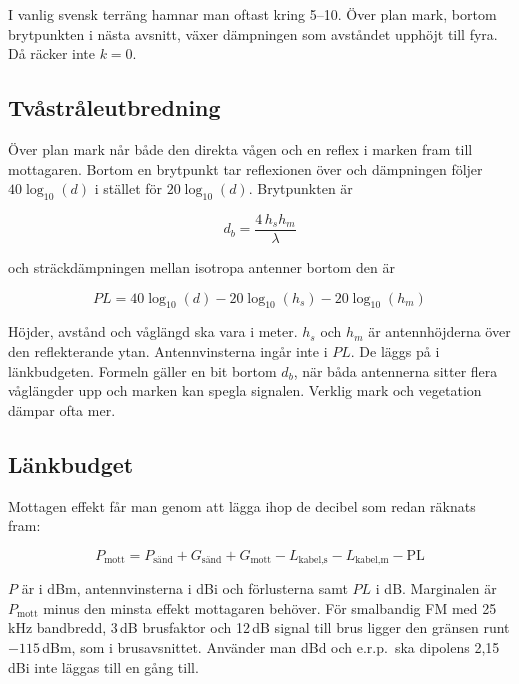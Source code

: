 I vanlig svensk terräng hamnar man oftast kring 5--10. Över plan mark,
bortom brytpunkten i nästa avsnitt, växer dämpningen som avståndet
upphöjt till fyra. Då räcker inte $k = 0$.

\subsection{Tvåstråleutbredning}

Över plan mark når både den direkta vågen och en reflex i marken fram till
mottagaren. Bortom en brytpunkt tar reflexionen över och dämpningen följer
$40\log_{10}(d)$ i stället för $20\log_{10}(d)$. Brytpunkten är

\begin{equation}
	d_b = \frac{4\, h_s h_m}{\lambda}
\end{equation}

och sträckdämpningen mellan isotropa antenner bortom den är

\begin{equation}
	PL = 40\log_{10}(d) - 20\log_{10}(h_s) - 20\log_{10}(h_m)
\end{equation}

Höjder, avstånd och våglängd ska vara i meter. $h_s$ och $h_m$ är
antennhöjderna över den reflekterande ytan. Antennvinsterna ingår inte i
$PL$. De läggs på i länkbudgeten. Formeln gäller en bit bortom $d_b$, när
båda antennerna sitter flera våglängder upp och marken kan spegla signalen.
Verklig mark och vegetation dämpar ofta mer.


\subsection{Länkbudget}

Mottagen effekt får man genom att lägga ihop de decibel som redan räknats
fram:

\begin{equation}
	P_{\text{mott}} = P_{\text{sänd}} + G_{\text{sänd}} + G_{\text{mott}}
	- L_{\text{kabel,s}} - L_{\text{kabel,m}} - \text{PL}
\end{equation}

$P$ är i dBm, antennvinsterna i dBi och förlusterna samt $PL$ i dB.
Marginalen är $P_{\mathrm{mott}}$ minus den minsta effekt mottagaren
behöver. För smalbandig FM med 25\,kHz bandbredd, 3\,dB brusfaktor och
12\,dB signal till brus ligger den gränsen runt $-115$\,dBm, som i
brusavsnittet. Använder man dBd och e.r.p.\ ska dipolens 2,15\,dBi inte
läggas till en gång till.


